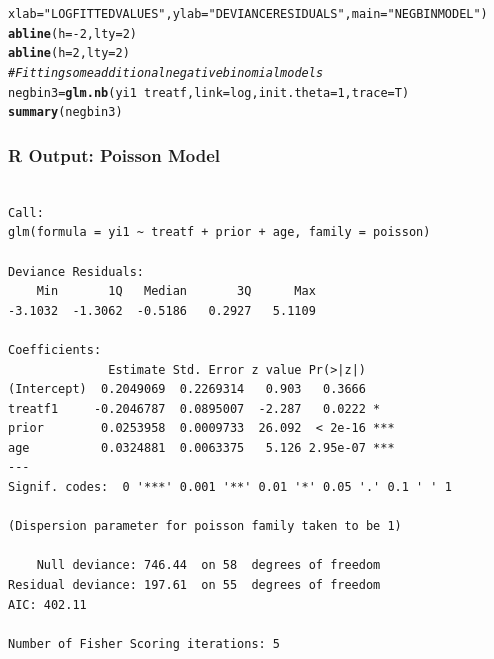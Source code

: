 \documentclass[oneside]{book}\usepackage[]{graphicx}\usepackage[svgnames]{xcolor}
\makeatletter
\newcommand{\hlnum}[1]{\textcolor[rgb]{0.686,0.059,0.569}{#1}}%
\newcommand{\hlstr}[1]{\textcolor[rgb]{0.192,0.494,0.8}{#1}}%
\newcommand{\hlcom}[1]{\textcolor[rgb]{0.678,0.584,0.686}{\textit{#1}}}%
\newcommand{\hlopt}[1]{\textcolor[rgb]{0,0,0}{#1}}%
\newcommand{\hlstd}[1]{\textcolor[rgb]{0.345,0.345,0.345}{#1}}%
\newcommand{\hlkwb}[1]{\textcolor[rgb]{0.69,0.353,0.396}{#1}}%
\newcommand{\hlkwc}[1]{\textcolor[rgb]{0.333,0.667,0.333}{#1}}%
\newcommand{\hlkwd}[1]{\textcolor[rgb]{0.737,0.353,0.396}{\textbf{#1}}}%
\newenvironment{kframe}{%
 \def\at@end@of@kframe{}%
 \ifinner\ifhmode%
  \def\at@end@of@kframe{\end{minipage}}%
  \begin{minipage}{\columnwidth}%
 \fi\fi%
 \def\FrameCommand##1{\hskip\@totalleftmargin \hskip-\fboxsep
 \colorbox{shadecolor}{##1}\hskip-\fboxsep
     \hskip-\linewidth \hskip-\@totalleftmargin \hskip\columnwidth}%
 \MakeFramed {\advance\hsize-\width
   \@totalleftmargin\z@ \linewidth\hsize
   \@setminipage}}%
 {\par\unskip\endMakeFramed%
 \at@end@of@kframe}
\newenvironment{knitrout}{}{} %
\makeatother
\begin{document}
\begin{knitrout}
\begin{kframe}
\begin{alltt}
  \hlkwc{xlab} \hlstd{=} \hlstr{"LOG FITTED VALUES"}\hlstd{,} \hlkwc{ylab} \hlstd{=} \hlstr{"DEVIANCE RESIDUALS"}\hlstd{,} \hlkwc{main} \hlstd{=} \hlstr{"NEG BIN MODEL"}\hlstd{)}
\hlkwd{abline}\hlstd{(}\hlkwc{h} \hlstd{=} \hlopt{-}\hlnum{2}\hlstd{,} \hlkwc{lty} \hlstd{=} \hlnum{2}\hlstd{)}
\hlkwd{abline}\hlstd{(}\hlkwc{h} \hlstd{=} \hlnum{2}\hlstd{,} \hlkwc{lty} \hlstd{=} \hlnum{2}\hlstd{)}
\hlcom{# Fitting some additional negative binomial models}
\hlstd{negbin3} \hlkwb{=} \hlkwd{glm.nb}\hlstd{(yi1} \hlopt{~} \hlstd{treatf,} \hlkwc{link} \hlstd{= log,} \hlkwc{init.theta} \hlstd{=} \hlnum{1}\hlstd{,} \hlkwc{trace} \hlstd{= T)}
\hlkwd{summary}\hlstd{(negbin3)}
\end{alltt}
\end{kframe}
\end{knitrout}
\subsubsection*{R Output: Poisson Model}
\begin{knitrout}
\color{fgcolor}\begin{kframe}
\begin{verbatim}

Call:
glm(formula = yi1 ~ treatf + prior + age, family = poisson)

Deviance Residuals: 
    Min       1Q   Median       3Q      Max  
-3.1032  -1.3062  -0.5186   0.2927   5.1109  

Coefficients:
              Estimate Std. Error z value Pr(>|z|)    
(Intercept)  0.2049069  0.2269314   0.903   0.3666    
treatf1     -0.2046787  0.0895007  -2.287   0.0222 *  
prior        0.0253958  0.0009733  26.092  < 2e-16 ***
age          0.0324881  0.0063375   5.126 2.95e-07 ***
---
Signif. codes:  0 '***' 0.001 '**' 0.01 '*' 0.05 '.' 0.1 ' ' 1

(Dispersion parameter for poisson family taken to be 1)

    Null deviance: 746.44  on 58  degrees of freedom
Residual deviance: 197.61  on 55  degrees of freedom
AIC: 402.11

Number of Fisher Scoring iterations: 5
\end{verbatim}
\end{kframe}
\end{knitrout}
\end{document}
